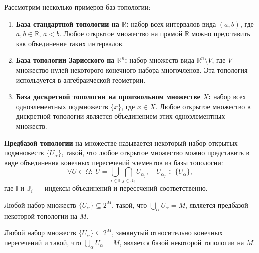 \begin{example}
	Рассмотрим несколько примеров баз топологии:
	\begin{enumerate}
		\item \textbf{База стандартной топологии на \( \mathbb{R} \):} набор всех интервалов вида \( (a, b) \), где \( a, b \in \mathbb{R} \), \( a < b \). Любое открытое множество на прямой \( \mathbb{R} \) можно представить как объединение таких интервалов.
		\item \textbf{База топологии Зарисского на \( \mathbb{R}^n \):} набор множеств вида \( \mathbb{R}^n \setminus V \), где \( V \) — множество нулей некоторого конечного набора многочленов. Эта топология используется в алгебраической геометрии.
		\item \textbf{База дискретной топологии на произвольном множестве \( X \):} набор всех одноэлементных подмножеств \( \{x\} \), где \( x \in X \). Любое открытое множество в дискретной топологии является объединением этих одноэлементных множеств.
	\end{enumerate}
\end{example}


\begin{definition}
	\textbf{Предбазой топологии} на множестве называется некоторый набор открытых подмножеств \( \{U_\alpha\} \), такой, что любое открытое множество можно представить в виде объединения конечных пересечений элементов из базы топологии:
	\begin{equation*}
		\forall U \in \Omega:\  U = \bigcup_{i \in \mathbb{I}} \bigcap_{j \in \mathbb{J}_i} U_{\alpha_j}, \quad U_{\alpha_j} \in \{U_\alpha\},
	\end{equation*}
	где \( \mathbb{I} \) и \( \mathbb{J}_i \) — индексы объединений и пересечений соответственно.
\end{definition}

\begin{remark}
	Любой набор множеств \( \{U_\alpha\} \subseteq 2^M \), такой, что \( \bigcup_\alpha U_\alpha = M \), является предбазой некоторой топологии на \( M \).
\end{remark}

\begin{remark}
	Любой набор множеств \( \{U_\alpha\} \subseteq 2^M \), замкнутый относительно конечных пересечений и такой, что \( \bigcup_\alpha U_\alpha = M \), является базой некоторой топологии на \( M \).
\end{remark}



